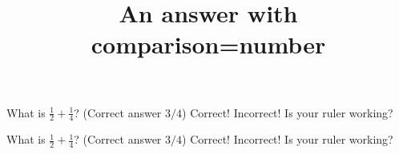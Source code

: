\documentclass[onepage]{webquiz}
\title{An answer with comparison=number}
\begin{document}
  \begin{question}     %
      What is $\frac12+\frac14$?
      (Correct answer $3/4$)
     \whenRight Correct!
     \whenWrong Incorrect! Is your ruler working?
  \end{question}
  \begin{question}     %
      What is $\frac12+\frac14$?
      (Correct answer $3/4$)
     \whenRight Correct!
     \whenWrong Incorrect! Is your ruler working?
  \end{question}
\end{document}
